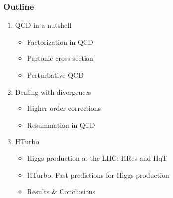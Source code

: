 \documentclass[aspectratio=43]{beamer}
\begin{document}
\begin{frame}

	\frametitle{Outline}
	
	\begin{enumerate}
		\item {\color{blue}QCD in a nutshell}
		\begin{itemize}
			\item Factorization in QCD
			\item Partonic cross section
			\item Perturbative QCD
		\end{itemize}
		\item {\color{blue}Dealing with divergences}
		\begin{itemize}
			\item Higher order corrections
			\item Resummation in QCD
		\end{itemize}
		\item {\color{blue}HTurbo}
		\begin{itemize}
			\item Higgs production at the LHC: HRes and HqT
			\item HTurbo: Fast predictions for Higgs production
			\item Results $\&$ Conclusions
		\end{itemize}
	\end{enumerate}
	
\end{frame}

\begin{frame}


\end{frame}
\end{document}
